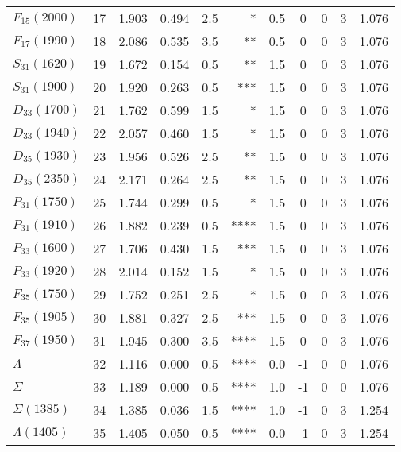 \documentclass[a4paper,10pt]{article}
\begin{document}
\begin{tabular}{|lr|cccrccccc|}
$F_{15}(2000)  $ &  17&  1.903&  0.494 &  2.5 &     *&      0.5&       0&       0&       3& 1.076\\
$F_{17}(1990)  $ &  18&  2.086&  0.535 &  3.5 &    **&      0.5&       0&       0&       3& 1.076\\
$S_{31}(1620)  $ &  19&  1.672&  0.154 &  0.5 &    **&      1.5&       0&       0&       3& 1.076\\
$S_{31}(1900)  $ &  20&  1.920&  0.263 &  0.5 &   ***&      1.5&       0&       0&       3& 1.076\\
$D_{33}(1700)  $ &  21&  1.762&  0.599 &  1.5 &     *&      1.5&       0&       0&       3& 1.076\\
$D_{33}(1940)  $ &  22&  2.057&  0.460 &  1.5 &     *&      1.5&       0&       0&       3& 1.076\\
$D_{35}(1930)  $ &  23&  1.956&  0.526 &  2.5 &    **&      1.5&       0&       0&       3& 1.076\\
$D_{35}(2350)  $ &  24&  2.171&  0.264 &  2.5 &    **&      1.5&       0&       0&       3& 1.076\\
$P_{31}(1750)  $ &  25&  1.744&  0.299 &  0.5 &     *&      1.5&       0&       0&       3& 1.076\\
$P_{31}(1910)  $ &  26&  1.882&  0.239 &  0.5 &  ****&      1.5&       0&       0&       3& 1.076\\
$P_{33}(1600)  $ &  27&  1.706&  0.430 &  1.5 &   ***&      1.5&       0&       0&       3& 1.076\\
$P_{33}(1920)  $ &  28&  2.014&  0.152 &  1.5 &     *&      1.5&       0&       0&       3& 1.076\\
$F_{35}(1750)  $ &  29&  1.752&  0.251 &  2.5 &     *&      1.5&       0&       0&       3& 1.076\\
$F_{35}(1905)  $ &  30&  1.881&  0.327 &  2.5 &   ***&      1.5&       0&       0&       3& 1.076\\
$F_{37}(1950)  $ &  31&  1.945&  0.300 &  3.5 &  ****&      1.5&       0&       0&       3& 1.076\\
\hline
$\Lambda       $ &  32&  1.116&  0.000 &  0.5 &  ****&      0.0&      -1&       0&       0& 1.076\\
$\Sigma        $ &  33&  1.189&  0.000 &  0.5 &  ****&      1.0&      -1&       0&       0& 1.076\\
$\Sigma(1385)  $ &  34&  1.385&  0.036 &  1.5 &  ****&      1.0&      -1&       0&       3& 1.254\\
$\Lambda(1405) $ &  35&  1.405&  0.050 &  0.5 &  ****&      0.0&      -1&       0&       3& 1.254\\

\end{tabular}
\end{document}
